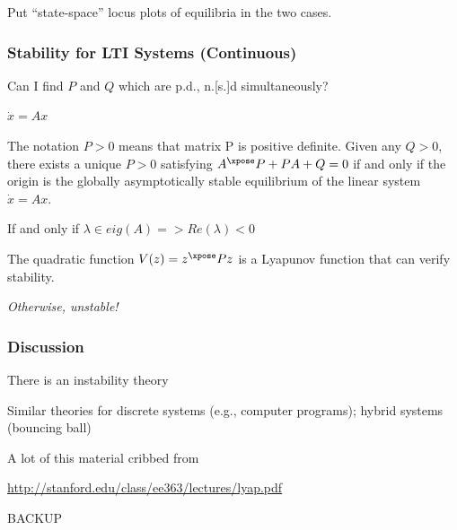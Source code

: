 \documentclass[12pt]{beamer}
\begin{document}
\begin{frame}
Put ``state-space'' locus plots of equilibria in the two cases.
\end{frame}





\begin{frame}
\frametitle{Stability for LTI Systems (Continuous)}


Can I find $P$ and $Q$ which are p.d., n.[s.]d simultaneously?

$\dot x = Ax$

The notation $P > 0$ means that matrix P is positive definite.
Given any $Q > 0$, there exists a unique $P > 0$ satisfying 
$A^\xpose P + P A + Q = 0$ if and only if the origin is the globally asymptotically stable equilibrium of the linear system $\dot x = A x$.

If and only if $\lambda \in eig(A) => Re(\lambda) < 0$

The quadratic function $V(z) = z^\xpose P z$ is a Lyapunov function that can verify stability.

\emph{Otherwise, unstable!}

\end{frame}






\begin{frame}
\frametitle{Discussion}

\begin{itemize}
\vitem
There is an instability theory

\vitem
Similar theories for discrete systems (e.g., computer programs);
hybrid systems (bouncing ball)

\vitem A lot of this material cribbed from

\url{http://stanford.edu/class/ee363/lectures/lyap.pdf}
\end{itemize}



\end{frame}









\begin{frame}
BACKUP
\end{frame}




\end{document}
